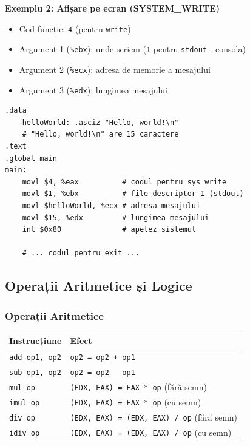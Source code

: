 \documentclass[12pt,a4paper]{article}
\begin{document}
\textbf{Exemplu 2: Afișare pe ecran (SYSTEM\_WRITE)}
\begin{itemize}
    \item Cod funcție: \texttt{4} (pentru \texttt{write})
    \item Argument 1 (\texttt{\%ebx}): unde scriem (\texttt{1} pentru \texttt{stdout} - consola)
    \item Argument 2 (\texttt{\%ecx}): adresa de memorie a mesajului
    \item Argument 3 (\texttt{\%edx}): lungimea mesajului
\end{itemize}
\begin{lstlisting}[language=x86asm]
.data
    helloWorld: .asciz "Hello, world!\n"
    # "Hello, world!\n" are 15 caractere
.text
.global main
main:
    movl $4, %eax          # codul pentru sys_write
    movl $1, %ebx          # file descriptor 1 (stdout)
    movl $helloWorld, %ecx # adresa mesajului
    movl $15, %edx         # lungimea mesajului
    int $0x80              # apelez sistemul
    
    # ... codul pentru exit ...
\end{lstlisting}

\subsection{Operații Aritmetice și Logice}

\subsubsection{Operații Aritmetice}
\begin{table}[ht!]
\centering
\begin{tabular}{ll}
\toprule
\textbf{Instrucțiune} & \textbf{Efect} \\
\midrule
\texttt{add op1, op2} & \texttt{op2 = op2 + op1} \\
\texttt{sub op1, op2} & \texttt{op2 = op2 - op1} \\
\texttt{mul op} & \texttt{(EDX, EAX) = EAX * op} (fără semn) \\
\texttt{imul op} & \texttt{(EDX, EAX) = EAX * op} (cu semn) \\
\texttt{div op} & \texttt{(EDX, EAX) = (EDX, EAX) / op} (fără semn) \\
\texttt{idiv op} & \texttt{(EDX, EAX) = (EDX, EAX) / op} (cu semn) \\
\bottomrule
\end{tabular}
\end{table}
\end{document}
